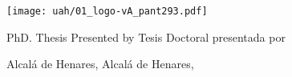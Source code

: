 
\thispagestyle{empty}
\large
\begin{center}

  \color{pantone293}

  \centerline{\texttt{[image: uah/01\_logo-vA\_pant293.pdf]}}

  {
    \huge{{\myPhDProgramEnglish}}
  }
  {
    \huge{{\myPhDProgram}}
  }

  \vspace{2cm}   
  
  \Huge\textbf{\myBookTitle}

  \vspace{10mm}
  
  {
    \huge{{PhD. Thesis Presented by}}
  }
  {
    \huge{{Tesis Doctoral presentada por}}
  }

  \huge{\textbf{\myAuthorFullName}}


  \vspace{10mm}

  {
    \huge {\expandafter\makefirstuc\expandafter{\wordAdvisorOrAdvisors}}
  }
  {
    \huge {\expandafter\makefirstuc\expandafter{\wordDirectorOrDirectores}}
  }  

  \textbf{\myAdvisorsConDrOrDra}


  \color{black}
  

\end{center}

\begin{bottomparagraph}
  \begin{center}

    \color{pantone293}

    {
      \huge {Alcalá de Henares, \myThesisdefenseDateEnglish}
    }
    { 
      \huge {Alcalá de Henares, \myThesisDefenseDate}
    }  
    \color{black}

  \end{center}
\end{bottomparagraph}








